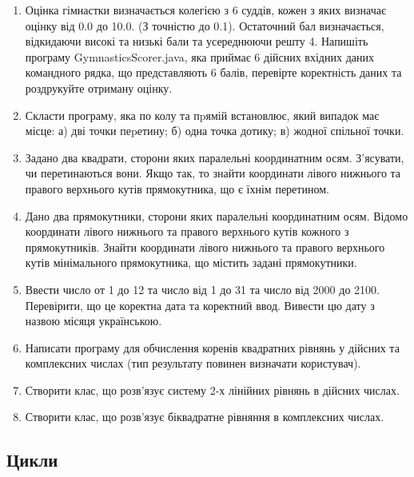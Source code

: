 \documentclass[]{article}
\begin{document}
\begin{enumerate}
\item Оцінка гімнастки визначається колегією з 6 суддів, кожен з яких визначає оцінку від 0.0 до 10.0. 
(З точністю до 0.1). Остаточний бал визначається, відкидаючи високі та низькі бали та усереднюючи решту 4.
Напишіть програму GymnasticsScorer.java, яка приймає 6 дійсних вхідних даних командного рядка, що представляють 6 балів,
перевірте коректність даних та роздрукуйте отриману оцінку. 

\item Скласти програму, яка по колу та пpямій  встановлює, який випадок має місце:
      а) дві точки пеpетину;
      б) одна точка дотику;
      в) жодної спільної точки.

\item Задано два квадрати, сторони яких паралельні координатним осям. З'ясувати, чи перетинаються вони. Якщо так, то знайти координати лівого нижнього та правого верхнього кутів прямокутника, що є їхнім перетином.
\item Дано два прямокутники, сторони яких паралельні координатним осям. Відомо координати лівого нижнього та правого верхнього кутів кожного з прямокутників. Знайти координати лівого нижнього та правого верхнього кутів мінімального прямокутника, що містить задані прямокутники.

\item Ввести число от 1  до 12 та число від 1 до 31 та число від 2000 до 2100. Перевірити, що це коректна дата та коректний ввод. Вивести цю дату з назвою місяця українською.

\item Написати програму для обчислення коренів квадратних рівнянь у дійсних та комплексних числах (тип результату повинен визначати користувач). 

\item Створити клас, що розв'язує систему 2-х лінійних рівнянь в дійсних числах.

\item Створити клас, що розв'язує біквадратне рівняння в комплексних числах.

\end{enumerate}

\subsection{Цикли}
\end{document}
